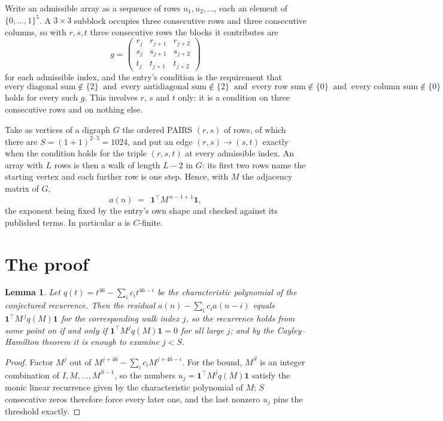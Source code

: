 \documentclass[11pt,a4paper]{article}
\theoremstyle{plain}
\newtheorem{lemma}[theorem]{Lemma}
\theoremstyle{definition}
\begin{document}
Write an admissible array as a sequence of rows $u_1,u_2,\dots$, each an element of
$\{0,\dots,1\}^{5}$. A $3\times3$ subblock occupies three consecutive rows and
three consecutive columns, so with $r,s,t$ three consecutive rows the blocks it
contributes are
\[
g=\begin{pmatrix}r_j&r_{j+1}&r_{j+2}\\ s_j&s_{j+1}&s_{j+2}\\ t_j&t_{j+1}&t_{j+2}\end{pmatrix}
\]
for each admissible index, and the entry's condition is the requirement that
\[
\text{every diagonal sum} \notin \{2\}\ \text{ and }\ \text{every antidiagonal sum} \notin \{2\}\ \text{ and }\ \text{every row sum} \notin \{0\}\ \text{ and }\ \text{every column sum} \notin \{0\}
\]
holds for every such $g$. This involves $r$, $s$ and $t$ only: it is a condition on
three consecutive rows and on nothing else.

Take as vertices of a digraph $G$ the ordered PAIRS $(r,s)$ of rows, of which there are
$S=(1+1)^{2\cdot5}=1024$, and put an edge $(r,s)\to(s,t)$ exactly when the condition
holds for the triple $(r,s,t)$ at every admissible index. An array with $L$ rows is then a
walk of length $L-2$ in $G$: its first two rows name the starting vertex and each further
row is one step. Hence, with $M$ the adjacency matrix of $G$,
\[
a(n)\;=\;\,\mathbf{1}^{\!\top}M^{\,n-1+1}\mathbf{1},
\]
the exponent being fixed by the entry's own shape and checked against its published terms.
In particular $a$ is $C$-finite.

\section{The proof}

\begin{lemma}\label{lem:crit}
Let $q(t)=t^{46}-\sum_i c_it^{46-i}$ be the characteristic polynomial of the
conjectured recurrence. Then the residual $a(n)-\sum_ic_ia(n-i)$ equals
$\mathbf{1}^{\!\top}M^{\,j}q(M)\mathbf{1}$ for the corresponding walk index
$j$, so the recurrence holds from some point on if and only if
$\mathbf{1}^{\!\top}M^{j}q(M)\mathbf{1}=0$ for all large $j$; and by the
Cayley--Hamilton theorem it is enough to examine $j<S$.
\end{lemma}

\begin{proof}
Factor $M^{j}$ out of $M^{j+46}-\sum_ic_iM^{j+46-i}$. For the bound, $M^{S}$
is an integer combination of $I,M,\dots,M^{S-1}$, so the numbers
$u_j=\mathbf{1}^{\!\top}M^{j}q(M)\mathbf{1}$ satisfy the monic linear recurrence given by
the characteristic polynomial of $M$; $S$ consecutive zeros therefore force every later one,
and the last nonzero $u_j$ pins the threshold exactly.
\end{proof}
\end{document}
